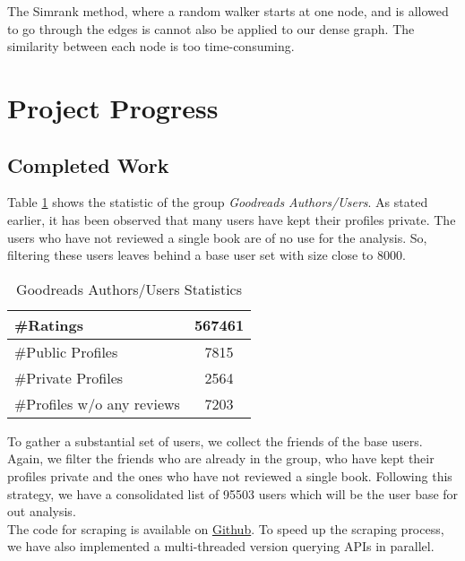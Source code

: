 \documentclass[11pt]{article}
\begin{document}
The Simrank method, where a random walker starts at one node, and is allowed to go through the edges is cannot also be applied to our dense graph.
The similarity between each node is too time-consuming. 
\section{Project Progress}

\subsection{Completed Work}
Table \ref{table:crawl_stat} shows the statistic of the group {\it Goodreads Authors/Users}. As stated earlier, it has been observed that many users have kept their profiles private. The users who have not reviewed a single book are of no use for the analysis. So, filtering these users leaves behind a base user set with size close to 8000.
\begin{table}[h]
\begin{center}
\begin{tabular}{lc}
\hline
\#Ratings                  & 567461 \\ \hline
\#Public Profiles          & 7815   \\ \hline
\#Private Profiles         & 2564   \\ \hline
\#Profiles w/o any reviews & 7203   \\ \hline
\end{tabular}
\end{center}
\caption{Goodreads Authors/Users Statistics} \label{table:crawl_stat}
\end{table}
To gather a substantial set of users, we collect the friends of the base users. Again, we filter the friends who are already in the group, who have kept their profiles private and the ones who have not reviewed a single book. Following this strategy, we have a consolidated list of 95503 users which will be the user base for out analysis. \\
The code for scraping is available on \href{https://github.com/acreux/nus-cs5345-project/tree/dev}{Github}. To speed up the scraping process, we have also implemented a multi-threaded version querying APIs in parallel.
\end{document}
